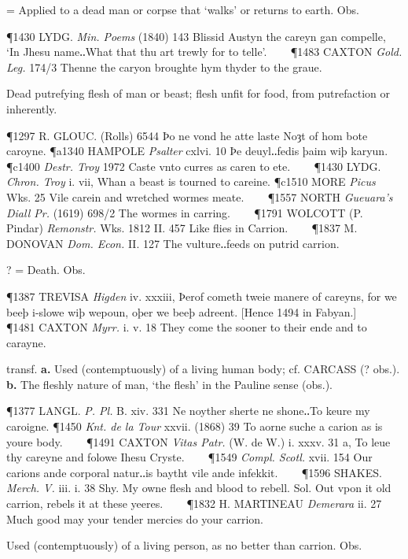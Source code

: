 \begin{description}[wide, labelwidth=!, labelindent=0pt]
\begin{myenumerate}
 = Applied to a dead man or corpse that ‘walks’ or returns to earth. Obs.

\P 1430 LYDG.  \textit{Min. Poems} (1840) 143 Blissid Austyn the careyn gan compelle, ‘In Jhesu name‥What that thu art trewly for to telle’.    
\P 1483 CAXTON  \textit{Gold. Leg.} 174/3 Thenne the caryon broughte hym thyder to the graue.

 Dead putrefying flesh of man or beast; flesh unfit for food, from putrefaction or inherently.

\P 1297 R. GLOUC.  (Rolls) 6544 Þo ne vond he atte laste Noȝt of hom bote caroyne.
\P a1340 HAMPOLE  \textit{Psalter} cxlvi. 10 Þe deuyl‥fedis þaim wiþ karyun.
\P c1400  \textit{Destr. Troy} 1972 Caste  vnto curres as caren to ete.    
\P 1430 LYDG.  \textit{Chron. Troy} i. vii, Whan a beast is tourned to careine.
\P c1510 MORE  \textit{Picus} Wks. 25 Vile carein and wretched wormes meate.    
\P 1557 NORTH  \textit{Gueuara's Diall Pr.} (1619) 698/2 The wormes in carring.    
\P 1791 WOLCOTT  (P. Pindar) \textit{Remonstr.} Wks. 1812 II. 457  Like flies in Carrion.    
\P 1837 M. DONOVAN  \textit{Dom. Econ.} II. 127 The vulture‥feeds on putrid carrion.

 ? = Death. Obs.

\P 1387 TREVISA  \textit{Higden} iv. xxxiii, Þerof cometh tweie manere of careyns, for we beeþ i-slowe wiþ wepoun, oþer we beeþ adreent. [Hence 1494 in Fabyan.]    
\P 1481 CAXTON  \textit{Myrr.} i. v. 18 They come the sooner to their ende and to carayne.

 transf. \textbf{a.} Used (contemptuously) of a living human body; cf. CARCASS (? obs.). \textbf{b.} The fleshly nature of man, ‘the flesh’ in the Pauline sense (obs.).

\P 1377 LANGL.  \textit{P. Pl.} B. xiv. 331 Ne noyther sherte ne shone‥To keure my caroigne.
\P 1450  \textit{Knt. de la Tour} xxvii. (1868) 39 To aorne suche a carion as is youre body.    
\P 1491 CAXTON  \textit{Vitas Patr.} (W. de W.) i. xxxv. 31 a, To leue thy careyne and folowe Ihesu Cryste.    
\P 1549 \textit{Compl.  Scotl.} xvii. 154 Our carions ande corporal natur‥is baytht vile ande infekkit.    
\P 1596 SHAKES.  \textit{Merch. V.} iii. i. 38 Shy. My owne flesh and blood to rebell. Sol. Out vpon it old carrion, rebels it at these yeeres.    
\P 1832 H. MARTINEAU  \textit{Demerara} ii. 27 Much good may your tender mercies do your carrion.

 Used (contemptuously) of a living person, as no better than carrion. Obs.


\end{myenumerate}
\end{description}
